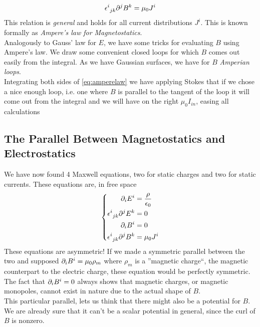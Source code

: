 \documentclass[../electromagnetism]{subfiles}
\begin{document}
\begin{equation}
	\epsilon^{i}_{\ jk}\partial^jB^k=\mu_0J^i
	\label{eq:amperelaw}
\end{equation}
This relation is \emph{general} and holds for all current distributions $J^i$. This is known formally as \textit{Ampere's law for Magnetostatics}.\\
Analogously to Gauss' law for $E$, we have some tricks for evaluating $B$ using Ampere's law. We draw some convenient closed loops for which $B$ comes out easily from the integral. As we have Gaussian surfaces, we have for $B$ \textit{Amperian loops}.\\
Integrating both sides of \eqref{eq:amperelaw} we have applying Stokes that if we chose a nice enough loop, i.e. one where $B$ is parallel to the tangent of the loop it will come out from the integral and we will have on the right $\mu_0 I_{in}$, easing all calculations
\subsection{The Parallel Between Magnetostatics and Electrostatics}
We have now found 4 Maxwell equations, two for static charges and two for static currents. These equations are, in free space
\begin{equation}
	\left\{\begin{aligned}
		\partial_iE^i&=\frac{\rho}{\epsilon_0}\\
		\epsilon^{i}_{\ jk}\partial^jE^k&=0\\
		\partial_iB^i&=0\\
		\epsilon^{i}_{\ jk}\partial^jB^k&=\mu_0J^i
\end{aligned}\right.
	\label{eq:maxstatic}
\end{equation}
These equations are asymmetric! If we made a symmetric parallel between the two and supposed $\partial_iB^i=\mu_0\rho_m$ where $\rho_m$ is a ''magnetic charge``, the magnetic counterpart to the electric charge, these equation would be perfectly symmetric. The fact that $\partial_iB^i=0$ always shows that magnetic charges, or magnetic monopoles, cannot exist in nature due to the actual shape of $B$.\\
This particular parallel, lets us think that there might also be a potential for $B$. We are already sure that it can't be a scalar potential in general, since the curl of $B$ is nonzero.
\end{document}

